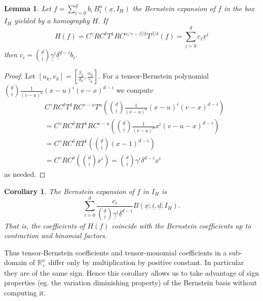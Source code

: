 \documentclass{sig-alternate}
\newtheorem{lemma}[theorem]{Lemma}
\newtheorem{corollary}[theorem]{Corollary}
\newcommand{\ds}{\displaystyle}
\def\RR{\mathbb{R}}
\newcommand{\uvec}[1]{\underline{#1}}
\begin{document}
\begin{lemma} \label{lem:bernsteincoefs}
Let $f=\sum_{\uvec i=0}^{\uvec d} b_i\, B_i^n(\uvec x,I_H)$ the Bernstein expansion of $f$ in the box $I_H$ yielded by a homography $H$. If 
$$
H(f) = C^{\gamma}RC^{\delta}T^1RC^{\alpha/\gamma - \beta/\delta} T^{\beta/\delta} ( f ) = \sum_{\uvec i=0}^{\uvec d} c_i \uvec x^{\uvec i}
$$
then
$\ds
 c_i = \binom{\uvec d}{\uvec i}\uvec \gamma^{\uvec i} \uvec \delta^{\uvec d-\uvec i}  b_i  .
$
\end{lemma}
\begin{proof}
Let $[u_k,v_k]=\left[ \frac{\beta_k}{\delta_k} , \frac{\alpha_k}{\gamma_k} \right] $. For a tensor-Bernstein polynomial $\ds \binom{\uvec d}{\uvec i} \frac{1}{(v-u)^d}(x-u)^i(v-x)^{d-i}$ we compute
\begin{align*}
                       &   C^{\gamma}RC^{\delta}T^1RC^{v-u} T^{u}    (  \binom{\uvec d}{\uvec i} \frac{1}{(v-u)^d}(x-u)^i(v-x)^{d-i} )  \\ 
                       &=  C^{\gamma}RC^{\delta}RT^{1}RC^{v-u}       (  \binom{\uvec d}{\uvec i} \frac{1}{(v-u)^d}x^i(v-u-x)^{d-i} )    \\
                       &=  C^{\gamma}RC^{\delta}RT^{1}              (  \binom{\uvec d}{\uvec i} (x-1)^{d-i})                           \\
                       &=  C^{\gamma}RC^{\delta}                    (  \binom{\uvec d}{\uvec i}  x^{i})                                
                       =                                            \binom{\uvec d}{\uvec i}\gamma^i \delta^{d-i} x^{i} 
\end{align*}
as needed.
\end{proof}

\begin{corollary}\label{cor:bernsteincoefs}
The Bernstein expansion of $f$ in $I_H$ is
$$
\sum_{i=0}^{d} \frac{ c_{i}}{\binom{\uvec d}{\uvec i} \uvec \gamma^{\uvec i} \uvec \delta^{\uvec d-\uvec i} } B (\uvec x ; {\uvec i},{\uvec d}; I_H)    .
$$
That is, the coefficients of $H(f)$ coincide with the Bernstein
coefficients up to contraction and binomial factors.
\end{corollary}

Thus tensor-Bernstein coefficients and tensor-mo\-no\-mial
coefficients in a sub-domain of $\RR_+^n$ differ only by
multiplication by positive constant. In particular they are of the
same sign. Hence this corollary allows us to take advantage of sign
properties (eg. the variation diminishing property) of the Bernstein
basis without computing it.
\end{document}
